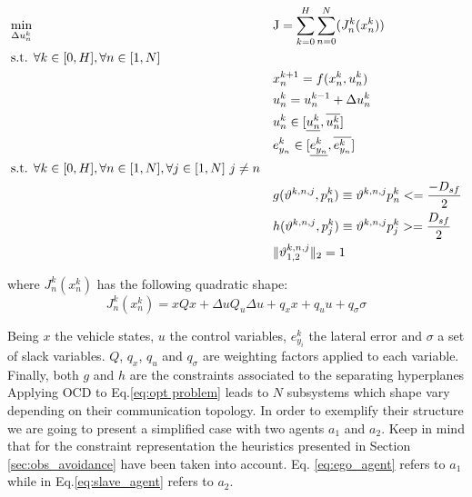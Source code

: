 \documentclass[a4paper,fleqn]{cas-sc}
\begin{document}
\begin{equation}
\label{eq:opt problem}
\begin{aligned}
    & \underset{\Delta u^k_n}{\text{min}}  &&\mathrm{J}=\sum_{k=0}^{H} \sum_{n=0}^{N}( J^k_n(x^k_n)) \\
    & \text{s.t. $\forall k \in [0,H], \forall n \in [1,N]$}\\
    &&& x^{k+1}_n = f(x^{k}_n,u^{k}_n)\\
    &&& u^k_n = u^{k-1}_{n} + \Delta u^k_n \\ 
    &&& u^k_n \in [\underline{u^k_n}, \overline{u^k_n} ] \\
    &&& e_{y_{n}}^{k} \in [\underline{e_{y_{n}}^{k}}, \overline{e_{y_{n}}^{k}} ] \\
    & \text{s.t. $ \forall k \in [0,H], \forall n \in [1,N] ,\forall j \in [1,N]\ j \neq n $}\\
    &&& g(\vartheta^{k,n,j},p^{k}_n) \equiv \vartheta^{k,n,j} p^{k}_n <= \frac{-D_{sf}}{2} \\
    &&& h(\vartheta^{k,n,j},p^{k}_j) \equiv \vartheta^{k,n,j} p^{k}_j >= \frac{D_{sf}}{2} \\
    &&& \lVert \vartheta^{k,n,j}_{1,2} \rVert_2 = 1 \\
\end{aligned}
\end{equation}

\noindent where $J^k_n(x^k_n)$ has the following quadratic shape:
\begin{equation}
    J^k_n(x^k_n) = xQx + \Delta u Q_u \Delta u + q_xx + q_uu + q_{\sigma}\sigma
\end{equation}

Being $x$ the vehicle states, $u$ the control variables, $e_{y_{i}}^{k}$ the lateral error and $\sigma$ a set of slack variables. $Q$, $q_x$, $q_u$ and $q_{\sigma}$ are weighting factors applied to each variable. Finally, both $g$ and $h$ are the constraints associated to the separating hyperplanes\\ 

Applying OCD to Eq.\eqref{eq:opt problem} leads to $N$ subsystems which shape vary depending on their communication topology. In order to exemplify their structure we are going to present a simplified case with two agents $a_1$ and $a_2$. Keep in mind that for the constraint representation the heuristics presented in Section \ref{sec:obs_avoidance} have been taken into account. Eq. \eqref{eq:ego_agent} refers to $a_1$ while in Eq.\eqref{eq:slave_agent} refers to $a_2$. 
\end{document}
